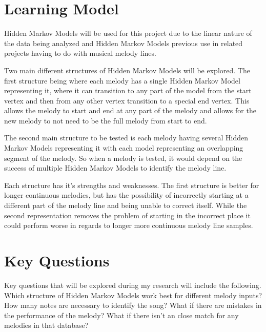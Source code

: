 \documentclass{article}
\begin{document}
	\section{Learning Model}
	Hidden Markov Models will be used for this project due to the linear nature of the data being 
	analyzed and Hidden Markov Models previous use in related projects having to do with musical melody lines. 
	
	Two main different structures of Hidden Markov Models will be explored. The first structure being 
	where each melody has a single Hidden Markov Model representing it, where it can transition to any
	part of the model from the start vertex and then from any other vertex transition to a special end 
	vertex. This allows the melody to start and end at any part of the melody and allows for the new melody 
	to not need to be the full melody from start to end.
	
	The second main structure to be tested is each melody having several Hidden Markov Models representing 
	it with each model representing an overlapping segment of the melody. So when a melody is tested, it would depend on 
	the success of multiple Hidden Markov Models to identify the melody line.
	
	Each structure has it's strengths and weaknesses. The first structure is better for longer continuous melodies, but has the 
	possibility of incorrectly starting at a different part of the melody line and being unable to correct itself.
	While the second representation removes the problem of starting in the incorrect place it could perform worse in regards
	to longer more continuous melody line samples.
		
	\section{Key Questions}
	Key questions that will be explored during my research will include the following. Which structure of Hidden Markov Models
	work best for different melody inputs?  How many notes are necessary to identify the song? What if there are mistakes in the 
	performance of the melody? What if there isn't an close match for any melodies in that database? 
	
\end{document}
